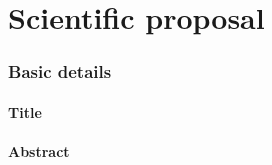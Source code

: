 \documentclass[a4paper,10pt,fleqn]{application}
\begin{document}



\part{Scientific proposal}

\section{Basic details}
\vspace{\baselineskip}

\subsection{Title}


\subsection{Abstract}
\end{document}
